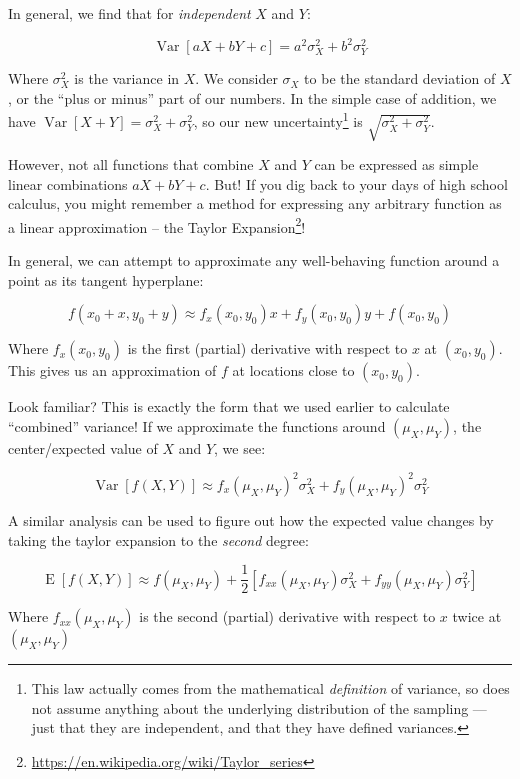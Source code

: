 \documentclass[]{article}
\renewcommand{\href}[2]{#2\footnote{\url{#1}}}
\begin{document}
In general, we find that for \emph{independent} \(X\) and \(Y\):

\[
\operatorname{Var}[aX + bY + c] = a^2 \sigma_X^2 + b^2 \sigma_Y^2
\]

Where \(\sigma_X^2\) is the variance in \(X\). We consider \(\sigma_X\) to be
the standard deviation of \(X\), or the ``plus or minus'' part of our numbers.
In the simple case of addition, we have \(\operatorname{Var}[X + Y] = \sigma_X^2
+ \sigma_Y^2\), so our new uncertainty\footnote{This law actually comes from the
  mathematical \emph{definition} of variance, so does not assume anything about
  the underlying distribution of the sampling --- just that they are
  independent, and that they have defined variances.} is
\(\sqrt{\sigma_X^2 + \sigma_Y^2}\).

However, not all functions that combine \(X\) and \(Y\) can be expressed as
simple linear combinations \(aX + bY + c\). But! If you dig back to your days of
high school calculus, you might remember a method for expressing any arbitrary
function as a linear approximation -- the
\href{https://en.wikipedia.org/wiki/Taylor_series}{Taylor Expansion}!

In general, we can attempt to approximate any well-behaving function around a
point as its tangent hyperplane:

\[
f(x_0 + x, y_0 + y) \approx f_x(x_0, y_0) x + f_y(x_0, y_0) y + f(x_0, y_0)
\]

Where \(f_x(x_0,y_0)\) is the first (partial) derivative with respect to \(x\)
at \((x_0, y_0)\). This gives us an approximation of \(f\) at locations close to
\((x_0, y_0)\).

Look familiar? This is exactly the form that we used earlier to calculate
``combined'' variance! If we approximate the functions around
\((\mu_X, \mu_Y)\), the center/expected value of \(X\) and \(Y\), we see:

\[
\operatorname{Var}[f(X,Y)] \approx f_x(\mu_X, \mu_Y)^2 \sigma_X^2 + f_y(\mu_X,\mu_Y)^2 \sigma_Y^2
\]

A similar analysis can be used to figure out how the expected value changes by
taking the taylor expansion to the \emph{second} degree:

\[
\operatorname{E}[f(X,Y)] \approx
f(\mu_X, \mu_Y) + \frac{1}{2}
\left[ f_{xx}(\mu_X, \mu_Y) \sigma_X^2 + f_{yy}(\mu_X, \mu_Y) \sigma_Y^2 \right]
\]

Where \(f_{xx}(\mu_X, \mu_Y)\) is the second (partial) derivative with respect
to \(x\) twice at \((\mu_X, \mu_Y)\)
\end{document}
